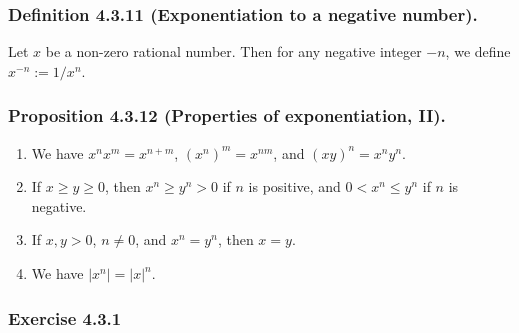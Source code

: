 \documentclass[12pt, letter]{article}
\newcommand{\ssc}{\subsubsection* }
\newcommand{\E}{Exercise }
\begin{document}
\subsubsection*{Definition 4.3.11 (Exponentiation to a negative number).}
Let $x$ be a non-zero rational number. Then for any negative integer $-n$, we define $x^{-n}:=1/x^n$.
\subsubsection*{Proposition 4.3.12 (Properties of exponentiation, II).}
\begin{enumerate}[label=(\alph*)]
    \item We have $x^n x^m=x^{n+m}$, $(x^n)^m=x^{nm}$, and $(xy)^n=x^n y^n$.
    \item If $x\geq y\geq 0$, then $x^n\geq y^n>0$ if $n$ is positive, and $0<x^n\leq y^n$ if $n$ is negative.
    \item If $x,y>0$, $n\ne 0$, and $x^n=y^n$, then $x=y$. 
    \item We have $|x^n|=|x|^n$.
\end{enumerate} 
\ssc{\E 4.3.1}
\end{document}
